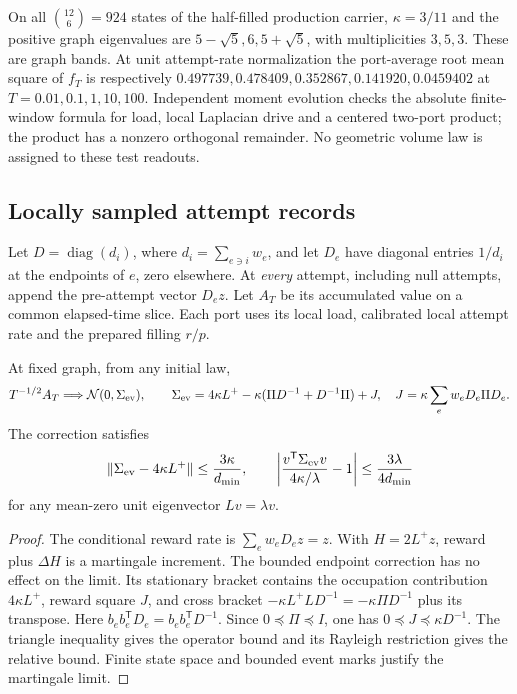On all \(\binom{12}{6}=924\) states of the half-filled production carrier,
\(\kappa=3/11\) and the positive graph eigenvalues are
\(5-\sqrt5,6,5+\sqrt5\), with multiplicities \(3,5,3\).
These are graph bands. At unit attempt-rate normalization the port-average
root mean square of \(f_T\) is respectively
\(0.497739,0.478409,0.352867,0.141920,0.0459402\) at
\(T=0.01,0.1,1,10,100\). Independent moment evolution checks the
absolute finite-window formula for load, local Laplacian drive and a
centered two-port product; the product has a nonzero orthogonal remainder.
No geometric volume law is assigned to these test readouts.

\subsection{Locally sampled attempt records}
\label{subsec:native-event-records}
Let \(D=\operatorname{diag}(d_i)\), where
\(d_i=\sum_{e\ni i}w_e\), and let \(D_e\) have diagonal entries
\(1/d_i\) at the endpoints of \(e\), zero elsewhere. At \emph{every}
attempt, including null attempts, append the pre-attempt vector \(D_ez\).
Let \(A_T\) be its accumulated value on a common elapsed-time slice.
Each port uses its local load, calibrated local attempt rate and the
prepared filling \(r/p\).

\begin{theorem}
At fixed graph, from any initial law,
\[
 T^{-1/2}A_T\Longrightarrow\mathcal N(0,\Sigma_{\rm ev}),\qquad
 \Sigma_{\rm ev}=4\kappa L^+
 -\kappa(\Pi D^{-1}+D^{-1}\Pi)+J,
 \quad J=\kappa\sum_e w_eD_e\Pi D_e.
\]
The correction satisfies
\[
 \|\Sigma_{\rm ev}-4\kappa L^+\|\le\frac{3\kappa}{d_{\min}},
 \qquad
 \left|\frac{v^{\mathsf T}\Sigma_{\rm ev}v}{4\kappa/\lambda}-1\right|
 \le\frac{3\lambda}{4d_{\min}}
\]
for any mean-zero unit eigenvector \(Lv=\lambda v\).
\end{theorem}
\begin{proof}
The conditional reward rate is \(\sum_e w_eD_ez=z\). With
\(H=2L^+z\), reward plus \(\Delta H\) is a martingale increment.
The bounded endpoint correction has no effect on the limit. Its stationary
bracket contains the occupation contribution \(4\kappa L^+\), reward
square \(J\), and cross bracket
\(-\kappa L^+LD^{-1}=-\kappa\Pi D^{-1}\) plus its transpose.
Here \(b_eb_e^{\mathsf T}D_e=b_eb_e^{\mathsf T}D^{-1}\).
Since \(0\preceq\Pi\preceq I\), one has
\(0\preceq J\preceq\kappa D^{-1}\). The triangle inequality gives
the operator bound and its Rayleigh restriction gives the relative bound.
Finite state space and bounded event marks justify the martingale limit.
\end{proof}

